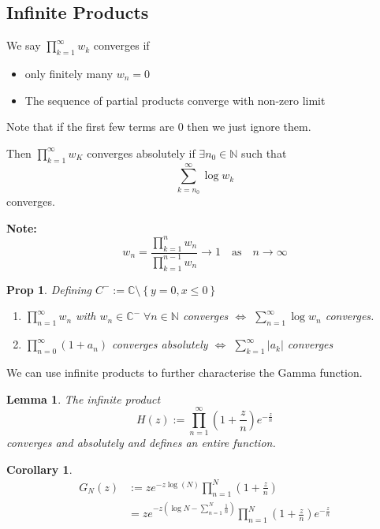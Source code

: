 \documentclass[11pt]{article}
\newcommand{\defeq}{:=}
\newcommand{\abs}[1]{\left|#1\right|}
\newcommand{\C}{\mathbb{C}}
\newcommand{\N}{\mathbb{N}}
\newenvironment{defin}
	{\begin{mdframed}[backgroundcolor=white, roundcorner=5pt, linewidth=1pt]}
	{\end{mdframed}}
\newcommand{\mdf}[1]{{\color{red} #1}}
\newenvironment{note}
	{\begin{mdframed}[backgroundcolor=white, linecolor=red, roundcorner=5pt, linewidth=1pt]\bfseries{Note:}\normalfont}
	{\end{mdframed}}
\newtheorem{cor}[theorem]{Corollary}
\newtheorem{prop}[theorem]{Prop}
\newtheorem{lemma}[theorem]{Lemma}
\begin{document}
\subsection{Infinite Products}
\begin{defin}
	We say $\prod_{k=1}^\infty  w_k$ \mdf{converges} if
	\begin{itemize}
		\item only finitely many $w_n=0$
		\item The sequence of partial products converge with non-zero limit
	\end{itemize}
	Note that if the first few terms are $0$ then we just ignore them.

	Then $\prod_{k=1}^\infty w_K$ \mdf{converges absolutely} if $\exists n_0\in\N$ such that
	\[
		\sum_{k=n_0}^{\infty}\log w_k
	\]
	converges.
\end{defin}

\begin{note}
	\[
		w_n=\frac{\prod_{k=1}^n w_n}{\prod_{k=1}^{n-1} w_n}\to 1 \quad \text{as} \quad n\to\infty
	\]
\end{note}


\begin{prop}
Defining $C^-\defeq\C\setminus\left\{y=0, x\leq 0\right\}$
\begin{enumerate}[label=(\alph*)]
	\item $\prod_{n=1}^\infty w_n$ with $w_n\in\C^-\;\forall n\in\N$ converges $\iff$ $\sum_{n=1}^{\infty}\log w_n$ converges.
	\item $\prod_{n=0}^\infty(1+a_n)$ converges absolutely $\iff$ $\sum_{k=1}^\infty\abs{a_k}$ converges
\end{enumerate}
\end{prop}

We can use infinite products to further characterise the Gamma function.

\begin{lemma}
The infinite product
\[
	H(z)\defeq\prod_{n=1}^\infty \left(1+\frac{z}{n}\right)e^{-\frac{z}{n}}
\]
converges and absolutely and defines an entire function.
\end{lemma}

\begin{cor}
	\begin{align*}
		G_N(z)&\defeq z e^{-z\log(N)}\prod_{n=1}^N\left(1+\frac{z}{n}\right)	\\
			  &= ze^{-z\left(\log N - \sum_{n=1}^{N}\frac{1}{n}\right)}\prod_{n=1}^N\left(1+\frac{z}{n}\right)e^{-\frac{z}{n}}
	\end{align*}
\end{cor}
\end{document}
